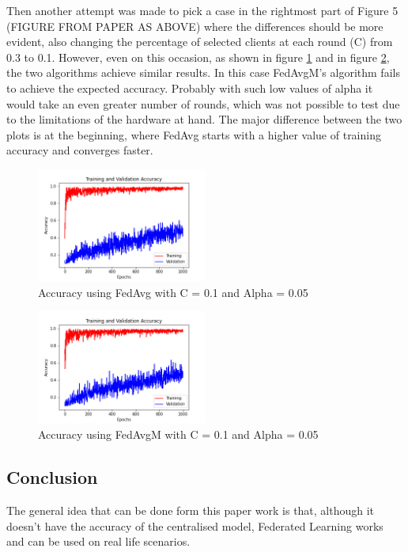 \documentclass[twocolumn]{article}
\begin{document}
Then another attempt was made to pick a case in the rightmost part of Figure 5 (FIGURE FROM PAPER AS ABOVE) where the differences should be more evident, also changing the percentage of selected clients at each round (C) from 0.3 to 0.1. 
However, even on this occasion, as shown in figure \ref{AccFedAvgC0.1A0.05} and in figure \ref{AccFedAvgMC0.1A0.05}, the two algorithms achieve similar results. In this case FedAvgM's algorithm fails to achieve the expected accuracy. Probably with such low values of alpha it would take an even greater number of rounds, which was not possible to test due to the limitations of the hardware at hand. The major difference between the two plots is at the beginning, where FedAvg starts with a higher value of training accuracy and converges faster.

\begin{figure}
    \centering
    \includegraphics[width=0.5\textwidth,height=.3\textheight]{10_AccuracyFedAvg_C0.1A_0.05.png}
    \caption{Accuracy using FedAvg with C = 0.1 and Alpha = 0.05}
     \label{AccFedAvgC0.1A0.05} 
\end{figure}

\begin{figure}
    \centering
    \includegraphics[width=0.5\textwidth,height=.3\textheight]{10_AccuracyFedAvgM_C0.1_A0.05.png}
    \caption{Accuracy using FedAvgM with C = 0.1 and Alpha = 0.05}
     \label{AccFedAvgMC0.1A0.05} 
\end{figure}





\subsection{Conclusion}
The general idea that can be done form this paper work is that, although it doesn't have the accuracy of the centralised model, Federated Learning works and can be used on real life scenarios.
\end{document}
